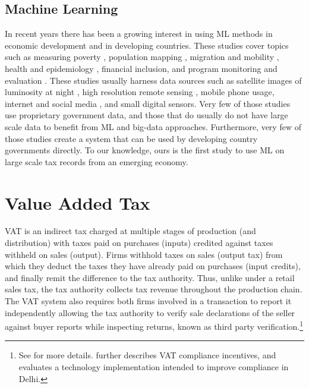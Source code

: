\subsection{Machine Learning}
\label{subsec:literature-ml}
In recent years there has been a growing interest in using ML methods in economic development and in developing countries. These studies cover topics such as measuring poverty \cite{blumenstock2015predicting, xie2015transfer,chen2011using},
population mapping \cite{deville2014dynamic}, migration and mobility \cite{lu2016unveiling}, health and epidemiology
\cite{wesolowski2014quantifying}, financial inclusion\cite{bjorkegren2017behavior}, and program monitoring and evaluation
\cite{wilson2015comparing}. These studies usually harness data sources such as satellite images of luminosity at night \cite{chen2011using}, high resolution remote sensing \cite{xie2015transfer}, mobile phone usage\cite{blumenstock2015predicting, deville2014dynamic, lu2016unveiling, bjorkegren2017behavior}, internet and social media \cite{llorente2015social}, and small digital sensors\cite{wilson2015comparing}. Very few of those studies use proprietary government data, and those that do usually do not have large scale data to benefit from ML and big-data approaches. Furthermore, very few of those studies create a system that can be used by developing country governments directly. To our knowledge, ours is the first study to use ML on large scale tax records from an emerging economy.

\section{Value Added Tax}
\label{sec:vat}
VAT is an indirect tax charged at multiple stages of production (and distribution) with taxes paid on purchases (inputs) credited against taxes withheld on sales (output). Firms withhold taxes on sales (output tax) from which they deduct the taxes they have already paid on purchases (input credits), and finally remit the difference to the tax authority. Thus, unlike under a retail sales tax, the tax authority collects tax revenue throughout the production chain. The VAT system also requires both firms involved in a transaction to report it independently allowing the tax authority to verify sale declarations of the seller against buyer reports while inspecting returns, known as third party verification.\footnote{See \cite{ITD2005} for more details.\cite{mittal2017vat} further describes VAT compliance incentives, and evaluates a technology implementation intended to improve compliance in Delhi. }

